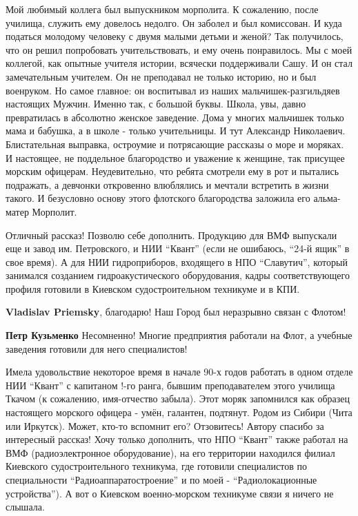 \begin{itemize}

Мой любимый коллега был выпускником морполита. К сожалению, после училища,
служить ему довелось недолго. Он заболел и был комиссован. И куда податься
молодому человеку с двумя малыми детьми и женой? Так получилось, что он решил
попробовать учительствовать, и ему очень понравилось. Мы с моей коллегой, как
опытные учителя истории, всячески поддерживали Сашу. И он стал замечательным
учителем. Он не преподавал не только историю, но и был военруком. Но самое
главное: он воспитывал из наших мальчишек-разгильдяев настоящих Мужчин. Именно
так, с большой буквы. Школа, увы, давно превратилась в абсолютно женское
заведение. Дома у многих мальчишек только мама и бабушка, а в школе - только
учительницы. И тут Александр Николаевич. Блистательная выправка, остроумие и
потрясающие рассказы о море и моряках. И настоящее, не поддельное благородство
и уважение к женщине, так присущее морским офицерам. Неудевительно, что ребята
смотрели ему в рот и пытались подражать, а девчонки откровенно влюблялись и
мечтали встретить в жизни такого. И безусловно основу этого флотского
благородства заложила его альма-матер Морполит.


Отличный рассказ! Позволю себе дополнить. Продукцию для ВМФ выпускали еще и
завод им. Петровского, и НИИ \enquote{Квант} (если не ошибаюсь, \enquote{24-й ящик} в свое
время). А для НИИ гидроприборов, входящего в НПО \enquote{Славутич}, который занимался
созданием гидроакустического оборудования, кадры соответствующего профиля
готовили в Киевском судостроительном техникуме и в КПИ.

\begin{itemize} %
\textbf{Vladislav Priemsky}, благодарю! Наш Город был неразрывно связан с Флотом!

\textbf{Петр Кузьменко} Несомненно! Многие предприятия работали на Флот, а учебные заведения готовили для него специалистов!
\end{itemize} %


Имела удовольствие некоторое время в начале 90-х годов работать в одном отделе
НИИ \enquote{Квант} с капитаном !-го ранга, бывшим преподавателем этого училища Ткачом
(к сожалению, имя-отчество забыла). Этот моряк запомнился как образец
настоящего морского офицера - умён, галантен, подтянут. Родом из Сибири (Чита
или Иркутск). Может, кто-то вспомнит его? Отзовитесь! Автору спасибо за
интересный рассказ! Хочу только дополнить, что НПО \enquote{Квант} также работал на ВМФ
(радиоэлектронное оборудование), на его территории находился филиал Киевского
судостроительного техникума, где готовили специалистов по специальности
\enquote{Радиоаппаратостроение} и по моей - \enquote{Радиолокационные устройства}). А вот о
Киевском военно-морском техникуме связи я ничего не слышала.


\end{itemize}
